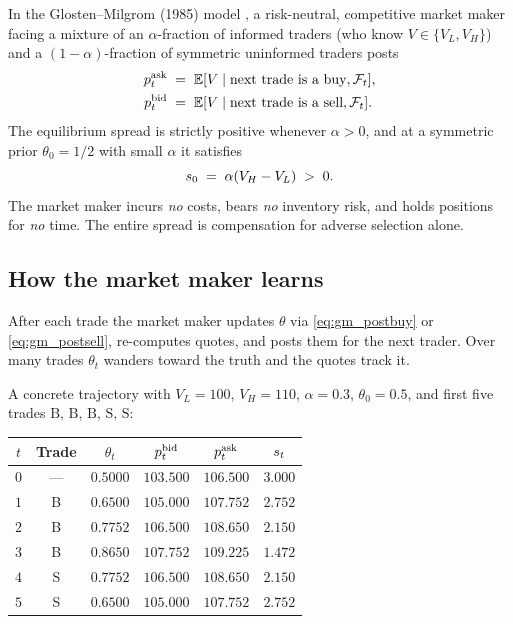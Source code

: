 \begin{keyfactbox}
In the Glosten--Milgrom (1985) model \citeGM{}, a risk-neutral,
competitive market maker facing a mixture of an $\alpha$-fraction
of informed traders (who know $V \in \{V_L, V_H\}$) and a
$(1-\alpha)$-fraction of symmetric uninformed traders posts
\begin{align*}
  p^{\mathrm{ask}}_t &\;=\; \mathbb{E}[V \mid \text{next trade is a buy}, \mathcal{F}_t], \\
  p^{\mathrm{bid}}_t &\;=\; \mathbb{E}[V \mid \text{next trade is a sell}, \mathcal{F}_t].
\end{align*}
The equilibrium spread is strictly positive whenever $\alpha > 0$,
and at a symmetric prior $\theta_0 = 1/2$ with small $\alpha$ it
satisfies
\[
  s_0 \;=\; \alpha (V_H - V_L) \;>\; 0.
\]
The market maker incurs \emph{no} costs, bears \emph{no} inventory
risk, and holds positions for \emph{no} time. The entire spread is
compensation for adverse selection alone.
\end{keyfactbox}

\subsection{How the market maker learns}
\label{subsec:gm_learning}

After each trade the market maker updates $\theta$ via
\cref{eq:gm_postbuy} or \cref{eq:gm_postsell}, re-computes quotes,
and posts them for the next trader. Over many trades $\theta_t$
wanders toward the truth and the quotes track it.

A concrete trajectory with $V_L = 100$, $V_H = 110$, $\alpha = 0.3$,
$\theta_0 = 0.5$, and first five trades $\text{B, B, B, S, S}$:

\begin{center}
\begin{tabular}{cccccc}
\toprule
$t$ & Trade & $\theta_t$ & $p^{\mathrm{bid}}_t$ & $p^{\mathrm{ask}}_t$ & $s_t$ \\
\midrule
$0$ & ---    & $0.5000$ & $103.500$ & $106.500$ & $3.000$ \\
$1$ & B      & $0.6500$ & $105.000$ & $107.752$ & $2.752$ \\
$2$ & B      & $0.7752$ & $106.500$ & $108.650$ & $2.150$ \\
$3$ & B      & $0.8650$ & $107.752$ & $109.225$ & $1.472$ \\
$4$ & S      & $0.7752$ & $106.500$ & $108.650$ & $2.150$ \\
$5$ & S      & $0.6500$ & $105.000$ & $107.752$ & $2.752$ \\
\bottomrule
\end{tabular}
\end{center}

